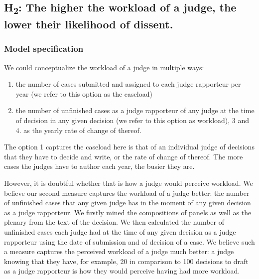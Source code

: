 \documentclass[
  11pt,
]{article}
\providecommand{\tightlist}{%
  \setlength{\itemsep}{0pt}\setlength{\parskip}{0pt}}
\begin{document}
\hypertarget{h2-the-higher-the-workload-of-a-judge-the-lower-their-likelihood-of-dissent.}{%
\subsection{\texorpdfstring{H\textsubscript{2}: The higher the workload
of a judge, the lower their likelihood of
dissent.}{H2: The higher the workload of a judge, the lower their likelihood of dissent.}}\label{h2-the-higher-the-workload-of-a-judge-the-lower-their-likelihood-of-dissent.}}

\hypertarget{model-specification-1}{%
\subsubsection{Model specification}\label{model-specification-1}}

We could conceptualize the workload of a judge in multiple ways:

\begin{enumerate}
\def\labelenumi{\arabic{enumi}.}
\tightlist
\item
  the number of cases submitted and assigned to each judge rapporteur
  per year (we refer to this option as the caseload)
\item
  the number of unfinished cases as a judge rapporteur of any judge at
  the time of decision in any given decision (we refer to this option as
  workload), 3 and 4. as the yearly rate of change of thereof.
\end{enumerate}

The option 1 captures the caseload here is that of an individual judge
of decisions that they have to decide and write, or the rate of change
of thereof. The more cases the judges have to author each year, the
busier they are.

However, it is doubtful whether that is how a judge would perceive
workload. We believe our second measure captures the workload of a judge
better: the number of unfinished cases that any given judge has in the
moment of any given decision as a judge rapporteur. We firstly mined the
compositions of panels as well as the plenary from the text of the
decision. We then calculated the number of unfinished cases each judge
had at the time of any given decision as a judge rapporteur using the
date of submission and of decision of a case. We believe such a measure
captures the perceived workload of a judge much better: a judge knowing
that they have, for example, 20 in comparison to 100 decisions to draft
as a judge rapporteur is how they would perceive having had more
workload.
\end{document}
